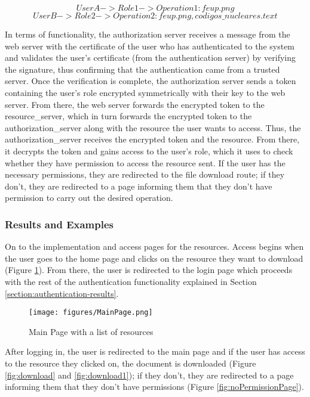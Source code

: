 \documentclass[10pt]{article}
\begin{document}
\[User A -> Role 1 -> Operation 1: feup.png\]
\[User B -> Role 2 -> Operation 2: feup.png, codigos\_nucleares.text\]

In terms of functionality, the authorization server receives a message from the web server with the certificate of the user who has authenticated to the system and validates the user's certificate (from the authentication server) by verifying the signature, thus confirming that the authentication came from a trusted server. Once the verification is complete, the authorization server sends a token containing the user's role encrypted symmetrically with their key to the web server. From there, the web server forwards the encrypted token to the resource\_server, which in turn forwards the encrypted token to the authorization\_server along with the resource the user wants to access.
Thus, the authorization\_server receives the encrypted token and the resource. From there, it decrypts the token and gains access to the user's role, which it uses to check whether they have permission to access the resource sent.
If the user has the necessary permissions, they are redirected to the file download route; if they don't, they are redirected to a page informing them that they don't have permission to carry out the desired operation.

\subsubsection{Results and Examples}

On to the implementation and access pages for the resources. Access begins when the user goes to the home page and clicks on the resource they want to download (Figure \ref{fig:MainPage}). From there, the user is redirected to the login page which proceeds with the rest of the authentication functionality explained in Section \ref{section:authentication-results}.

\begin{center}
    \begin{figure}[H]
        \centering
        \texttt{[image: figures/MainPage.png]}
            \caption{Main Page with a list of resources}
        \label{fig:MainPage}
    \end{figure}
\end{center}

After logging in, the user is redirected to the main page and if the user has access to the resource they clicked on, the document is downloaded (Figure \ref{fig:download} and \ref{fig:download1}); if they don't, they are redirected to a page informing them that they don't have permissions (Figure \ref{fig:noPermissionPage}).
\end{document}
